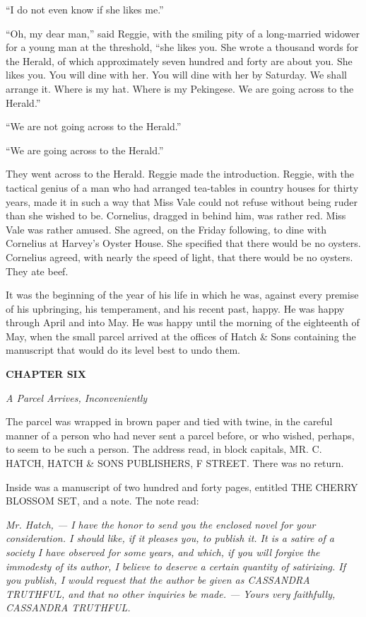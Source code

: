 \documentclass[12pt,openright]{book}
\begin{document}
“I do not even know if she likes me.”

“Oh, my dear man,” said Reggie, with the smiling pity of a long-married widower for a young man at the threshold, “she likes you. She wrote a thousand words for the Herald, of which approximately seven hundred and forty are about you. She likes you. You will dine with her. You will dine with her by Saturday. We shall arrange it. Where is my hat. Where is my Pekingese. We are going across to the Herald.”

“We are not going across to the Herald.”

“We are going across to the Herald.”

They went across to the Herald. Reggie made the introduction. Reggie, with the tactical genius of a man who had arranged tea-tables in country houses for thirty years, made it in such a way that Miss Vale could not refuse without being ruder than she wished to be. Cornelius, dragged in behind him, was rather red. Miss Vale was rather amused. She agreed, on the Friday following, to dine with Cornelius at Harvey’s Oyster House. She specified that there would be no oysters. Cornelius agreed, with nearly the speed of light, that there would be no oysters. They ate beef.

It was the beginning of the year of his life in which he was, against every premise of his upbringing, his temperament, and his recent past, happy. He was happy through April and into May. He was happy until the morning of the eighteenth of May, when the small parcel arrived at the offices of Hatch \& Sons containing the manuscript that would do its level best to undo them.

\textbf{CHAPTER SIX}

\textit{A Parcel Arrives, Inconveniently}

The parcel was wrapped in brown paper and tied with twine, in the careful manner of a person who had never sent a parcel before, or who wished, perhaps, to seem to be such a person. The address read, in block capitals, MR. C. HATCH, HATCH \& SONS PUBLISHERS, F STREET. There was no return.

Inside was a manuscript of two hundred and forty pages, entitled THE CHERRY BLOSSOM SET, and a note. The note read:

\textit{Mr. Hatch, — I have the honor to send you the enclosed novel for your consideration. I should like, if it pleases you, to publish it. It is a satire of a society I have observed for some years, and which, if you will forgive the immodesty of its author, I believe to deserve a certain quantity of satirizing. If you publish, I would request that the author be given as CASSANDRA TRUTHFUL, and that no other inquiries be made. — Yours very faithfully, CASSANDRA TRUTHFUL.}
\end{document}
